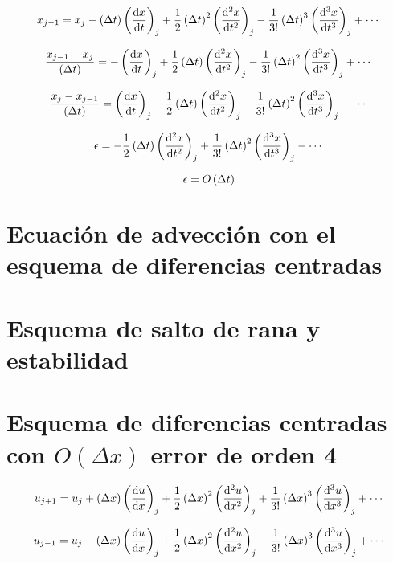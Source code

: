 \documentclass{article}
\begin{document}
\begin{equation}
x_{j-1} = x_j - \Dt\derord{x}{t} + \frac12\Dt^2\derord[2]{x}{t}
- \frac1{3!}\Dt^3\derord[3]{x}{t} + \cdots
\end{equation}

\begin{equation}
\frac{x_{j-1} - x_j}{\Dt} = - \derord{x}{t} +
\frac12\Dt\derord[2]{x}{t} - 
	\frac1{3!}\dxdero{x}{t}{3} + \cdots
\end{equation}

\begin{equation}
\frac{x_{j} - x_{j-1}}{\Dt} = \derord{x}{t} -
\frac12\Dt\derord[2]{x}{t} + \frac1{3!}\dxdero{x}{t}{3} -
\cdots
\end{equation}

\begin{equation}
\epsilon = - \frac12\Dt\derord[2]{x}{t} + \frac1{3!}\dxdero{x}{t}{3} - \cdots
\end{equation}

\begin{equation}
\epsilon = O\left( \Delta t \right)
\end{equation}

\section{Ecuación de advección con el esquema de diferencias centradas}

%

\section{Esquema de salto de rana y estabilidad}


\section{Esquema de diferencias centradas con \texorpdfstring{$O(\Delta x)$}{} error de orden 4}

\begin{equation}
u_{j+1} = u_j + \Dx\derord{u}{x} + 
\frac12\Dx^2\derord[2]{u}{x} + 
\frac1{3!}\Dx^3\derord[3]{u}{x} + \cdots
\label{eq:ujp1}
\end{equation}

\begin{equation}
u_{j-1} = u_j - \Dx\derord{u}{x} + 
\frac12\Dx^2\derord[2]{u}{x} - 
\frac1{3!}\Dx^3\derord[3]{u}{x} + \cdots
\label{eq:ujm1}
\end{equation}
\end{document}
